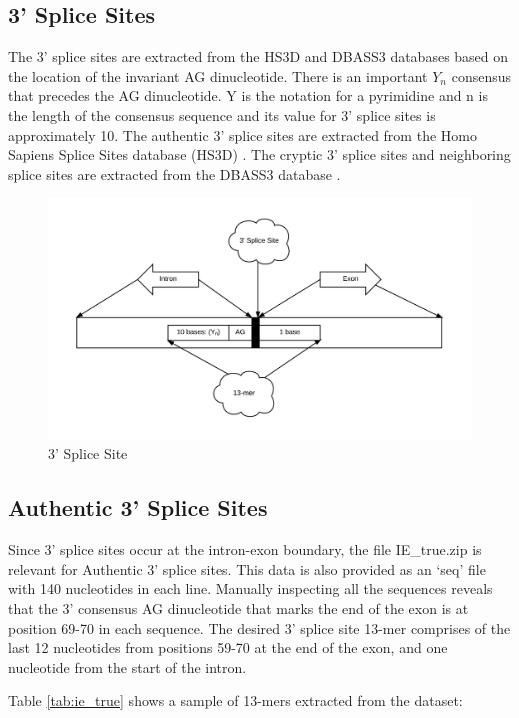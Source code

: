 \documentclass[12pt,a4paper]{article}
\begin{document}
	\subsection{3' Splice Sites}
	The 3’ splice sites are extracted from the HS3D and DBASS3 databases based on the location of the invariant AG dinucleotide. There is an important $Y_n$ consensus that precedes the AG dinucleotide. Y is the notation for a pyrimidine and n is the length of the consensus sequence and its value for 3' splice sites is approximately 10. The authentic 3' splice sites are extracted from the Homo Sapiens Splice Sites database (HS3D) \cite{hs3d-1,hs3d-2}. The cryptic 3' splice sites and neighboring splice sites are extracted from the DBASS3 database \cite{dbass-0,dbass-1,dbass-2}.
   	\begin{figure}[H]
   		\includegraphics[width=\textwidth]{"threeprime"}
   		\caption{3' Splice Site}
   		\centering
   	\end{figure}

	\subsection{Authentic 3' Splice Sites}
	Since 3’ splice sites occur at the intron-exon boundary, the file IE\_true.zip is relevant for Authentic 3’ splice sites. This data is also provided as an ‘seq’ file with 140 nucleotides in each line. Manually inspecting all the sequences reveals that the 3’ consensus AG dinucleotide that marks the end of the exon is at position 69-70 in each sequence. The desired 3’ splice site 13-mer comprises of the last 12 nucleotides from positions 59-70 at the end of the exon, and one nucleotide from the start of the intron. \par
	Table \ref{tab:ie_true} shows a sample of 13-mers extracted from the dataset:
\end{document}
